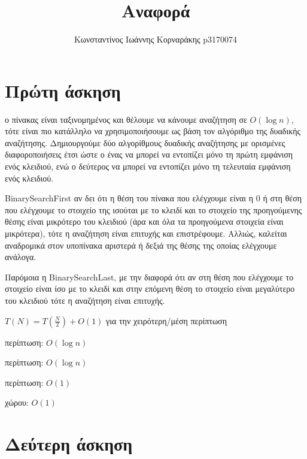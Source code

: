 \documentclass[14pt]{article}
\author{Κωνσταντίνος Ιωάννης Κορναράκης p3170074}
\title{Αναφορά}
\begin{document}
\maketitle

\begin{center}
    \section{Πρώτη άσκηση}
     ο πίνακας είναι ταξινομημένος και θέλουμε να κάνουμε αναζήτηση σε $O(\log{}n)$, τότε είναι πιο κατάλληλο να χρησιμοποιήσουμε ως βάση τον αλγόριθμο της δυαδικής αναζήτησης. Δημιουργούμε δύο αλγορίθμους δυαδικής αναζήτησης με ορισμένες διαφοροποιήσεις έτσι ώστε ο ένας να μπορεί να εντοπίζει μόνο τη πρώτη εμφάνιση ενός κλειδιού, ενώ ο δεύτερος να μπορεί να εντοπίζει μόνο τη τελευταία εμφάνιση ενός κλειδιού.\newline
    
     BinarySearchFirst αν δει ότι η θέση του πίνακα που ελέγχουμε είναι η 0 ή στη θέση που ελέγχουμε το στοιχείο της ισούται με το κλειδί και το στοιχείο της προηγούμενης θέσης είναι μικρότερο του κλειδιού (άρα και όλα τα προηγούμενα στοιχεία είναι μικρότερα), τότε η αναζήτηση είναι επιτυχής και επιστρέφουμε. Αλλιώς, καλείται αναδρομικά στον υποπίνακα αριστερά ή δεξιά της θέσης της οποίας ελέγχουμε ανάλογα.\newline

    \par Παρόμοια η BinarySearchLast, με την διαφορά ότι αν στη θέση που ελέγχουμε το στοιχείο είναι ίσο με το κλειδί και στην επόμενη θέση το στοιχείο είναι μεγαλύτερο του κλειδιού τότε η αναζήτηση είναι επιτυχής.\newline
    
    \par$T(N) = T(\frac{N}{2}) + O(1)$ για την χειρότερη/μέση περίπτωση\newline
    
     περίπτωση: $Ο(\log{}n)$\newline
    
     περίπτωση: $O(\log{}n)$\newline

     περίπτωση: $O(1)$\newline
    
     χώρου: $O(1)$\newline
    
    \newpage
    \section{Δεύτερη άσκηση}
    

\end{center}
\end{document}

